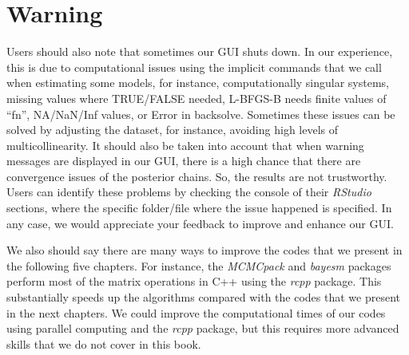 \section{Warning}\label{secGUI7}

Users should also note that sometimes our GUI shuts down. In our experience, this is due to computational issues using the implicit commands that we call when estimating some models, for instance, computationally singular systems, missing values where TRUE/FALSE needed, L-BFGS-B needs finite values of ``fn'', NA/NaN/Inf values, or Error in backsolve. Sometimes these issues can be solved by adjusting the dataset, for instance, avoiding high levels of multicollinearity. It should also be taken into account that when warning messages are displayed in our GUI, there is a high chance that there are convergence issues of the posterior chains. So, the results are not trustworthy. Users can identify these problems by checking the console of their \textit{RStudio} sections, where the specific folder/file where the issue happened is specified. In any case, we would appreciate your feedback to improve and enhance our GUI.

We also should say there are many ways to improve the codes that we present in the following five chapters. For instance, the \textit{MCMCpack} and \textit{bayesm} packages perform most of the matrix operations in C++ using the \textit{rcpp} package. This substantially speeds up the algorithms compared with the codes that we present in the next chapters. We could improve the computational times of our codes using parallel computing and the \textit{rcpp} package, but this requires more advanced skills that we do not cover in this book.
